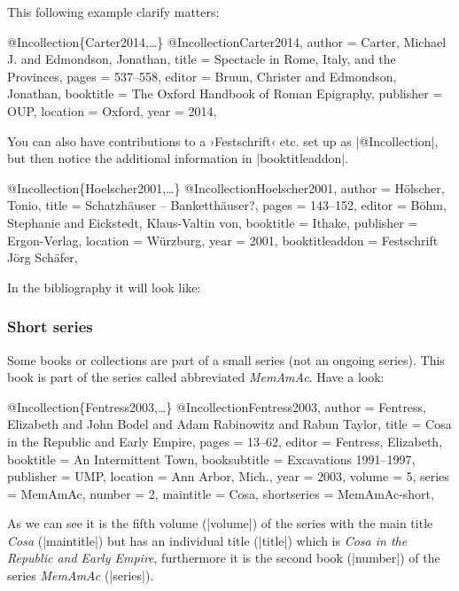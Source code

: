 \documentclass[a4paper,
10pt,
greek,
french,
spanish,
italian,
ngerman,
english
]{ltxdoc}
\begin{document}
 
 
This following example clarify matters:
 \begin{bibexample}[label=Carter2014]{{@}Incollection\{Carter2014,…\}}
@Incollection{Carter2014,
  author    = {Carter, Michael J. and Edmondson, Jonathan},
  title     = {Spectacle in Rome, Italy, and the Provinces},
  pages     = {537--558},
  editor    = {Bruun, Christer and Edmondson, Jonathan},
  booktitle = {The Oxford Handbook of Roman Epigraphy},
  publisher = OUP,    %
  location  = {Oxford},
  year      = {2014},
}
\end{bibexample}


You can also have contributions to a ›Festschrift‹ etc. set up as |@Incollection|,
but then notice the additional information in |booktitleaddon|.
\begin{bibexample}[label=Hoelscher2001]{{@}Incollection\{Hoelscher2001,…\}}
@Incollection{Hoelscher2001,
  author         = {Hölscher, Tonio},
  title          = {Schatzhäuser -- Banketthäuser?},
  pages          = {143--152},
  editor         = {Böhm, Stephanie and Eickstedt, Klaus-Valtin von},
  booktitle      = {Ithake},
  publisher      = {Ergon-Verlag},
  location       = {Würzburg},
  year           = {2001},
  booktitleaddon = {Festschrift Jörg Schäfer},
}
\end{bibexample}
In the bibliography it will look like:

\subsubsection{Short series}
Some books or collections are part of a small series (not an ongoing series).
This book is part of the series called abbreviated \emph{MemAmAc}.
Have a look:
\begin{bibexample}[label=Fentress2003]{{@}Incollection\{Fentress2003,…\}}
@Incollection{Fentress2003,
  author       = {Fentress, Elizabeth and John Bodel and Adam Rabinowitz and Rabun Taylor},
  title        = {Cosa in the Republic and Early Empire},
  pages        = {13--62},
  editor       = {Fentress, Elizabeth},
  booktitle    = {An Intermittent Town},
  booksubtitle = {Excavations 1991--1997},
  publisher    = UMP,    %
  location     = {Ann Arbor, Mich.},
  year         = {2003},
  volume       = {5},
  series       = MemAmAc,    %
  number       = {2},
  maintitle    = {Cosa},
  shortseries  = MemAmAc-short,    %
}
\end{bibexample}
As we can see it is the fifth volume (|volume|) of the series with the main title 
\emph{Cosa} (|maintitle|) but has an individual title (|title|) which is
\emph{Cosa in the Republic and Early Empire}, furthermore it is the second book (|number|) 
of the series  \emph{MemAmAc} (|series|).
\end{document}
